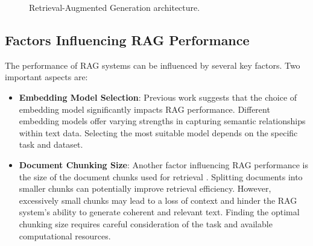 \begin{figure}[h]
  \centering
  
  \caption{Retrieval-Augmented Generation architecture.}
  \label{fig:RAG_scheme}
\end{figure}

\subsection{Factors Influencing \ac{RAG} Performance}
The performance of \ac{RAG} systems can be influenced by several key factors.
Two important aspects are:

\begin{itemize}
    \item \textbf{Embedding Model Selection}:
        Previous work \cite{joshi2024RAGemb} suggests that the choice of embedding model significantly impacts \ac{RAG} performance.
        Different embedding models offer varying strengths in capturing semantic relationships within text data.
        Selecting the most suitable model depends on the specific task and dataset.
    \item \textbf{Document Chunking Size}:
        Another factor influencing \ac{RAG} performance is the size of the document chunks used for retrieval \cite{theja2023RAGchunk}.
        Splitting documents into smaller chunks can potentially improve retrieval efficiency.
        However, excessively small chunks may lead to a loss of context and hinder the \ac{RAG} system's ability to generate coherent and relevant text.
        Finding the optimal chunking size requires careful consideration of the task and available computational resources.    
\end{itemize}





